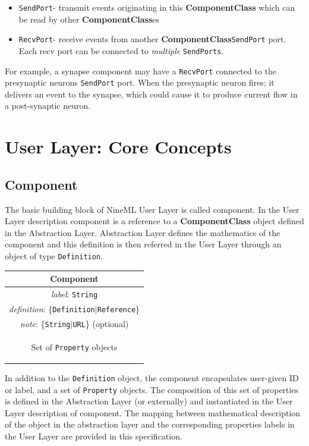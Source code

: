 \documentclass{article}
\newcommand{\ComponentClass}{{\bf{ComponentClass}}\xspace}
\newcommand{\ComponentClasses}{{\bf{ComponentClass}}es\xspace}
\newcommand{\SendPort}{{\tt{SendPort}}\xspace}
\newcommand{\RecvPort}{{\tt{RecvPort}}\xspace}
\newcommand{\SendPorts}{{\tt{SendPorts}}\xspace}
\begin{document}
\begin{itemize}
\item \SendPort - transmit events originating in this \ComponentClass which can be
read by
other \ComponentClasses
\item \RecvPort - receive events from another \ComponentClass \SendPort port.
Each recv port can be connected to \emph{multiple} \SendPorts.
\end{itemize}

For example, a synapse component may have a \RecvPort connected to the
presynaptic neurons \SendPort port. When the presynaptic neuron fires;
it delivers an event to the synapse, which could cause it to produce current
flow in a post-synaptic neuron.

\newpage

\section{User Layer: Core Concepts}
\label{UserL}

\subsection{Component}

The basic building block of NineML User Layer is called component. In the
User Layer description component is a reference to a \ComponentClass
object defined in the Abstraction Layer. Abstraction Layer defines the
mathematics of the component and this definition is then referred in the
User Layer through an object of type {\tt Definition}.

\begin{table}[htb]
\center
\begin{tabular}{|c|}
\hline
\hline
Component \\
\hline
\hline
{\em label}: {\tt String} \\
\hline
{\em definition}: \{{\tt Definition}$|${\tt Reference}\}\\
\hline
{\em note}: \{{\tt String}$|${\tt URL}\} (optional)\\
\hline
\colorbox{issuecolor}{\parbox{0.4\linewidth}
{\center Set of {\tt Property} objects}} \\
\hline
\end{tabular}
\end{table}

In addition to the {\tt Definition} object, the component encapsulates
user-given ID or label, and a set of {\tt Property} objects. The composition
of this set of properties is defined in the Abstraction Layer (or externally)
and instantiated in the User Layer description of component. The mapping
between mathematical description of the object in the abstraction
layer and the corresponding properties labels in the User Layer are
provided in this specification.
\end{document}
